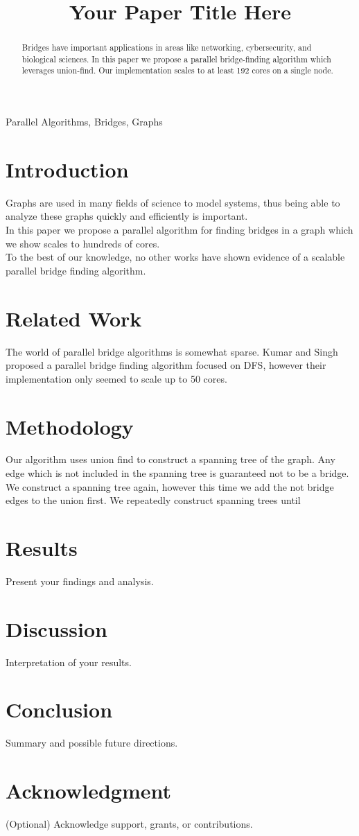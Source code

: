 \documentclass[conference]{IEEEtran}
\title{Your Paper Title Here}
\author{
\IEEEauthorblockN{Keegan Smith}
\IEEEauthorblockA{
\textit{Computer Science} \\
\textit{Texas A\&M University} \\
College Station TX, United States \\
keeganasmith2003@tamu.edu
}
}
\begin{document}
\maketitle

\begin{abstract}
Bridges have important applications in areas like networking, cybersecurity, and biological sciences. In this paper we propose a parallel bridge-finding algorithm which leverages union-find. Our implementation scales to at least 192 cores on a single node. 
\end{abstract}

\begin{IEEEkeywords}
Parallel Algorithms, Bridges, Graphs
\end{IEEEkeywords}

\section{Introduction}
Graphs are used in many fields of science to model systems, thus being able to analyze these graphs quickly and efficiently is important. \\
In this paper we propose a parallel algorithm for finding bridges in a graph which we show scales to hundreds of cores. \\
To the best of our knowledge, no other works have shown evidence of a scalable parallel bridge finding algorithm.
\section{Related Work}
The world of parallel bridge algorithms is somewhat sparse. Kumar and Singh ~\cite{kumar2021efficient} proposed a parallel bridge finding algorithm focused on DFS, however their implementation only seemed to scale up to 50 cores.
\section{Methodology}
Our algorithm uses union find to construct a spanning tree of the graph. Any edge which is not included in the spanning tree is guaranteed not to be a bridge. We construct a spanning tree again, however this time we add the not bridge edges to the union first. We repeatedly construct spanning trees until 
\section{Results}
Present your findings and analysis.

\section{Discussion}
Interpretation of your results.

\section{Conclusion}
Summary and possible future directions.

\section*{Acknowledgment}
(Optional) Acknowledge support, grants, or contributions.



\end{document}
